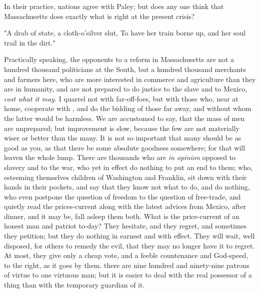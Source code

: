 In their practice, nations agree with Paley; but does any one think
that Massachusetts does exactly what is right at the present
crisis?\par

\setupnarrower[left=24pt, right=24pt]
"A drab of state, a cloth-o'silver slut,
To have her train borne up, and her soul trail in the dirt."
\stopnarrower
\par

Practically speaking, the opponents to a reform in Massachusetts are
not a hundred thousand politicians at the South, but a hundred thousand
merchants and farmers here, who are more interested in commerce and
agriculture than they are in humanity, and are not prepared to do
justice to the slave and to Mexico, {\sl cost what it may.} I quarrel
not with far-off-foes, but with those who, near at home, cooperate
with , and do the bidding of those far away, and without whom the
latter would be harmless. We are accustomed to say, that the mass of
men are unprepared; but improvement is slow, because the few are not
materially wiser or better than the many. It is not so important that
many should be as good as you, as that there be some absolute goodness
somewhere; for that will leaven the whole lump. There are thousands
who are {\sl in opinion} opposed to slavery and to the war, who yet in
effect do nothing to put an end to them; who, esteeming themselves
children of Washington and  Franklin, sit down with their hands in
their pockets, and say that they know not what to do, and do nothing,
who even postpone the question of freedom to the question of
free-trade, and quietly read the prices-current along with the latest
advices from Mexico, after dinner, and it may be, fall asleep them
both. What is the price-current of an honest man and patriot to-day?
They hesitate, and they regret, and sometimes they petition; but they
do nothing in earnest and with effect. They will wait, well disposed,
for others to remedy the evil, that they may no longer have it to
regret. At most, they give only a cheap vote, and a feeble countenance
and God-speed, to the right, as it goes by them. there are nine
hundred and ninety-nine patrons of virtue to one virtuous man; but it
is easier to deal with the real possessor of a thing than with the
temporary guardian of it. \par

